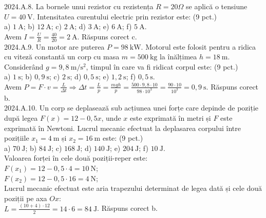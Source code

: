 2024.A.8. La bornele unui rezistor cu rezistența $R=20 \Omega$ se aplică o tensiune $U=40 \mathrm{~V}$. Intensitatea curentului electric prin rezistor este: (9 pct.)\\ a) $1 \mathrm{~A}$; b) $12 \mathrm{~A}$; c) $2 \mathrm{~A}$; d) $3 \mathrm{~A}$; e) $6 \mathrm{~A}$; f) $5 \mathrm{~A}$.\\ Avem $I=\frac{U}{R}=\frac{40}{20}=2 \mathrm{~A}$. Răspuns corect c.\\

2024.A.9. Un motor are puterea $P=98 \mathrm{~kW}$. Motorul este folosit pentru a ridica cu viteză constantă un corp cu masa $m=500 \mathrm{~kg}$ la înălțimea $h=18 \mathrm{~m}$. Considerând $g=9,8 \mathrm{~m} / \mathrm{s}^{2}$, timpul în care va fi ridicat corpul este: (9 pct.)\\ a) $1 \mathrm{~s}$; b) $0,9 \mathrm{~s}$; c) $2 \mathrm{~s}$; d) $0,5 \mathrm{~s}$; e) $1,2 \mathrm{~s}$; f) $0,5 \mathrm{~s}$.\\ Avem $P=F \cdot v=\frac{L}{\Delta t} \Rightarrow \Delta t=\frac{L}{p}=\frac{m g h}{p}=\frac{500 \cdot 9,8 \cdot 10}{98 \cdot 10^{3}}=\frac{90 \cdot 10}{10^{3}}=0,9 \mathrm{~s}$. Răspuns corect b.\\

2024.A.10. Un corp se deplasează sub acțiunea unei forțe care depinde de poziție după legea $F(x)=12-0,5 x$, unde $x$ este exprimată în metri și $F$ este exprimată în Newtoni. Lucrul mecanic efectuat la deplasarea corpului între pozițiile  $x_{1}=4 \mathrm{~m}$ și $x_{2}=16 \mathrm{~m}$ este: (9 pct.)\\ a) $70 \mathrm{~J}$; b) $84 \mathrm{~J}$; c) $168 \mathrm{~J}$; d) $140 \mathrm{~J}$; e) $204 \mathrm{~J}$; f) $10 \mathrm{~J}$.\\ Valoarea forței în cele două poziții-reper este:\\ $F(x_{1})=12-0,5 \cdot 4=10 \mathrm{~N}$;\\ $F(x_{2})=12-0,5 \cdot 16=4 \mathrm{~N}$;\\ Lucrul mecanic efectuat este aria trapezului determinat de legea dată și cele două poziții pe axa $Ox$:\\ $L=\frac{(10+4) \cdot 12}{2}=14 \cdot 6=84 \mathrm{~J}$. Răspuns corect b.\\

